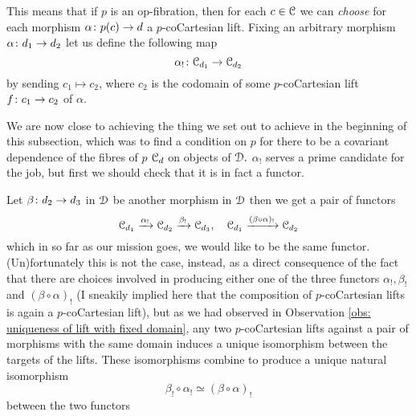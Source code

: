 \begin{construction}
    This means that if $p$ is an op-fibration, then for each $c\in \mathcal C$ we can \textit{choose} for each morphism $\alpha\colon p(c)\rightarrow d$ a $p$-coCartesian lift. Fixing an arbitrary morphism $\alpha \colon d_1 \rightarrow d_2$ let us define the following map \[\alpha_{!}\colon \mathcal C_{d_1}\rightarrow \mathcal C_{d_2}\] by sending $c_1 \mapsto c_2$, where $c_2$ is the codomain of some $p$-coCartesian lift $f\colon c_1 \rightarrow c_2$ of $\alpha.$ ~

    We are now close to achieving the thing we set out to achieve in the beginning of this subsection, which was to find a condition on $p$ for there to be a covariant dependence of the fibres of $p$ $\mathcal C_d$ on objects of $\mathcal D.$ $\alpha_!$ serves a prime candidate for the job, but first we should check that it is in fact a functor.
    
    Let $\beta\colon d_2 \rightarrow d_3$ in $\mathcal D$ be another morphism in $\mathcal D$ then we get a pair of functors \[\mathcal C_{d_1}\xrightarrow{\alpha_!}\mathcal C_{d_2}\xrightarrow{\beta_!} \mathcal C_{d_3}, \quad \mathcal C_{d_{1}}\xrightarrow{(\beta\circ \alpha)_!}\mathcal C_{d_2}\] which in so far as our mission goes, we would like to be the same functor. (Un)fortunately this is not the case, instead, as a direct consequence of the fact that there are choices involved in producing either one of the three functors $\alpha_!,\beta_!$ and $(\beta\circ \alpha)_!$ (I sneakily implied here that the composition of $p$-coCartesian lifts is again a $p$-coCartesian lift), but as we had observed in Observation \ref{obs: uniqueness of lift with fixed domain}, any two $p$-coCartesian lifts against a pair of morphisms with the same domain induces a unique isomorphism between the targets of the lifts. These isomorphisms combine to produce a unique natural isomorphism \[\beta_!\circ \alpha_! \simeq (\beta\circ \alpha)_!\] between the two functors 
\end{construction}
